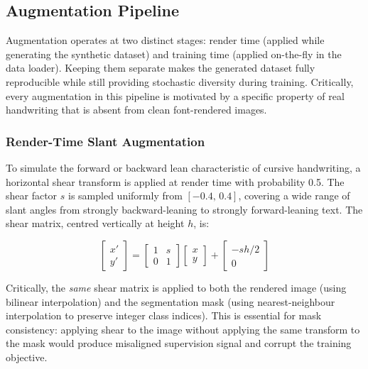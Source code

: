 \documentclass[a4paper,11pt]{article}
\begin{document}
\subsection{Augmentation Pipeline}

Augmentation operates at two distinct stages: render time (applied while generating the
synthetic dataset) and training time (applied on-the-fly in the data loader). Keeping
them separate makes the generated dataset fully reproducible while still providing
stochastic diversity during training. Critically, every augmentation in this pipeline is
motivated by a specific property of real handwriting that is absent from clean
font-rendered images.

\subsubsection{Render-Time Slant Augmentation}

To simulate the forward or backward lean characteristic of cursive handwriting, a
horizontal shear transform is applied at render time with probability 0.5. The shear
factor $s$ is sampled uniformly from $[-0.4,\, 0.4]$, covering a wide range of slant
angles from strongly backward-leaning to strongly forward-leaning text. The shear
matrix, centred vertically at height $h$, is:

\begin{equation}
    \begin{bmatrix} x' \\ y' \end{bmatrix}
    =
    \begin{bmatrix} 1 & s \\ 0 & 1 \end{bmatrix}
    \begin{bmatrix} x \\ y \end{bmatrix}
    +
    \begin{bmatrix} -sh/2 \\ 0 \end{bmatrix}
    \label{eq:shear}
\end{equation}

Critically, the \emph{same} shear matrix is applied to both the rendered image (using
bilinear interpolation) and the segmentation mask (using nearest-neighbour interpolation
to preserve integer class indices). This is essential for mask consistency: applying
shear to the image without applying the same transform to the mask would produce
misaligned supervision signal and corrupt the training objective.
\end{document}
